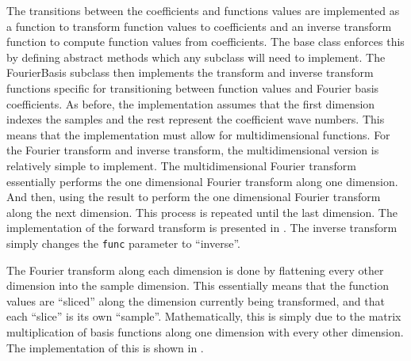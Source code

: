 The transitions between the coefficients and functions values are implemented as a function to transform function values to coefficients and an inverse transform function to compute function values from coefficients. The base class enforces this by defining abstract methods which any subclass will need to implement. The FourierBasis subclass then implements the transform and inverse transform functions specific for transitioning between function values and Fourier basis coefficients. As before, the implementation assumes that the first dimension indexes the samples and the rest represent the coefficient wave numbers. This means that the implementation must allow for multidimensional functions. For the Fourier transform and inverse transform, the multidimensional version is relatively simple to implement. The multidimensional Fourier transform essentially performs the one dimensional Fourier transform along one dimension. And then, using the result to perform the one dimensional Fourier transform along the next dimension. This process is repeated until the last dimension. The implementation of the forward transform is presented in . The inverse transform simply changes the \verb|func| parameter to \enquote{inverse}.

The Fourier transform along each dimension is done by flattening every other dimension into the sample dimension. This essentially means that the function values are \enquote{sliced} along the dimension currently being transformed, and that each \enquote{slice} is its own \enquote{sample}. Mathematically, this is simply due to the matrix multiplication of basis functions along one dimension with every other dimension. The implementation of this is shown in .

